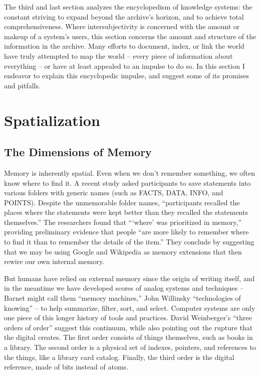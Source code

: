 The third and last section analyzes the encyclopedism of knowledge systems: the constant striving to expand beyond the archive’s horizon, and to achieve total comprehensiveness. Where intersubjectivity is concerned with the amount or makeup of a system’s users, this section concerns the amount and structure of the information in the archive. Many efforts to document, index, or link the world have truly attempted to map the world – every piece of information about everything – or have at least appealed to an impulse to do so. In this section I endeavor to explain this encyclopedic impulse, and suggest some of its promises and pitfalls.

\section{Spatialization}

\subsection{The Dimensions of Memory}

Memory is inherently spatial. Even when we don’t remember something, we often know where to find it. A recent study asked participants to save statements into various folders with generic names (such as FACTS, DATA, INFO, and POINTS).  Despite the unmemorable folder names, “participants recalled the places where the statements were kept better than they recalled the statements themselves.” The researchers found that “‘where’ was prioritized in memory,” providing preliminary evidence that people “are more likely to remember where to find it than to remember the details of the item.” They conclude by suggesting that we may be using Google and Wikipedia as memory extensions that then rewire our own internal memory.

But humans have relied on external memory since the origin of writing itself, and in the meantime we have developed scores of analog systems and techniques – Barnet might call them “memory machines,” John Willinsky “technologies of knowing” – to help summarize, filter, sort, and select.  Computer systems are only one piece of this longer history of tools and practices. David Weinberger’s “three orders of order” suggest this continuum, while also pointing out the rupture that the digital creates. The first order consists of things themselves, such as books in a library. The second order is a physical set of indexes, pointers, and references to the things, like a library card catalog. Finally, the third order is the digital reference, made of bits instead of atoms. 

